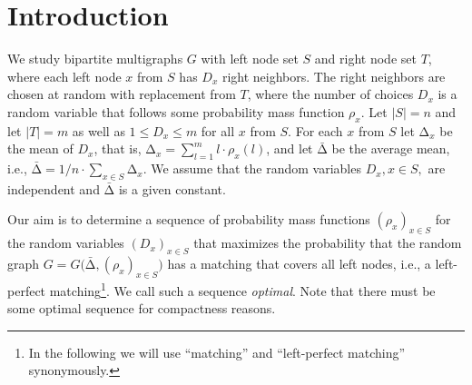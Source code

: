 \let\accentvec\vec \documentclass{llncs}
\newcommand{\randv}{\ensuremath{D}}
\newcommand{\cells}{\ensuremath{m}}
\newcommand{\pmf}{\ensuremath{{\rho}}}
\newcommand{\mean}{{\mathrm{\scriptstyle\Delta}}}
\newcommand{\Amean}{\bar{\mean}}
\newcommand{\graph}{\ensuremath{G}}
\newcommand{\low}{\ensuremath{l}}
\newcommand{\abs}[1]{\lvert#1\rvert}
\begin{document}
\section{Introduction}
We study bipartite multigraphs $\graph$ with left node set $S$ and right node set ${T}$,
where each left node $x$ from $S$ has $\randv_x$ right neighbors.
The right neighbors are chosen at random with replacement from ${T}$,
where the number of choices $\randv_x$ is a random variable that follows some probability mass function $\pmf_x$.
Let $\abs{S}=n$ and let $\abs{{T}}=m$ as well as $1\leq\randv_x\leq \cells$ for all $x$ from $S$.
For each $x$ from $S$ let $\mean_x$ be the mean of $\randv_x$, that is, $\mean_x=\sum_{\low=1}^\cells \low\cdot \rho_x(\low)$,
and let $\Amean$ be the average mean, i.e., $\Amean={1}/{n}\cdot \sum_{x\in S} \mean_x$.
We assume that the random variables $\randv_x, x\in S,$ are independent and $\Amean$ is a given constant. 

Our aim is to determine a sequence of probability mass functions $(\pmf_x)_{x\in S}$ for the random variables $(D_x)_{x\in S}$
that maximizes the probability that the random graph $\graph=\graph\big(\Amean, (\pmf_x)_{x\in S} \big)$
has a matching that covers all left nodes, i.e., a left-perfect matching\footnote{In the following we will use ``matching'' and ``left-perfect matching'' synonymously.}.
We call such a sequence \emph{optimal}. Note that there must be some optimal sequence for compactness reasons.
\end{document}
